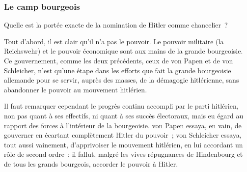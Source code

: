 \documentclass[french,twoside]{book} %
\begin{document}
\subsubsection[Le camp bourgeois]{Le camp bourgeois}
\noindent Quelle est la portée exacte de la nomination de Hitler comme chancelier ?\par
Tout d'abord, il est clair qu'il n'a pas le pouvoir. Le pouvoir militaire (la Reichswehr) et le pouvoir économique sont aux mains de la grande bour­geoisie. Ce gouvernement, comme les deux précédents, ceux de von Papen et de von Schleicher, n'est qu'une étape dans les efforts que fait la grande bourgeoisie allemande pour se servir, auprès des masses, de la démagogie hitlérienne, sans abandonner le pouvoir au mouvement hitlérien.\par
Il faut remarquer cependant le progrès continu accompli par le parti hitlérien, non pas quant à ses effectifs, ni quant à ses succès électoraux, mais eu égard au rapport des forces à l'intérieur de la bourgeoisie. von Papen essaya, en vain, de gouverner en écartant complètement Hitler du pouvoir ; von Schleicher essaya, tout aussi vainement, d'apprivoiser le mouvement hitlérien, en lui accordant un rôle de second ordre ; il fallut, malgré les vives répugnances de Hindenbourg et de tous les grands bourgeois, accorder le pouvoir à Hitler.\par
\end{document}
